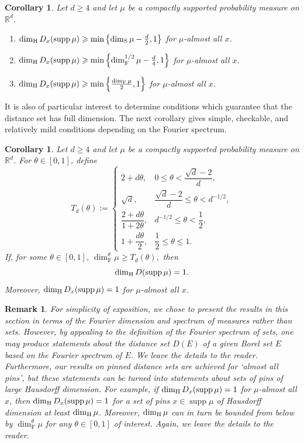 \documentclass[11pt]{amsart}
\numberwithin{equation}{section}
\renewcommand{\ge}{\geqslant}
\renewcommand{\le}{\leqslant}
\newcommand{\hd}{\dim_{\textup{H}}}
\newcommand{\fs}{\dim^\theta_{\mathrm{F}}}
\newcommand{\fd}{\dim_{\mathrm{F}}}
\newcommand{\sd}{\dim_{\mathrm{S}}}
\newtheorem{remark}[theorem]{Remark}
\newtheorem{corollary}[theorem]{Corollary}
\newcommand{\spt}{\operatorname{supp}}
\theoremstyle{plain}
\theoremstyle{remark}
\newcommand{\Rd}{\mathbb{R}^d}
\begin{document}
\begin{corollary}\label{cor2}
Let \(d\ge 4\) and let \(\mu\) be a compactly supported probability measure on \(\Rd\).
\begin{enumerate}
    \item \(\hd D_x(\spt\mu)\ge \min\left\{\sd\mu-\frac d2,1\right\}\) for \(\mu\)-almost all \(x\).

    \item \(\hd D_x(\spt\mu)\ge \min\left\{\dim_{\mathrm{F}}^{1/2}\mu-\frac d4,1\right\}\) for \(\mu\)-almost all \(x\).

    \item \(\hd D_x(\spt\mu)\ge \min\left\{\frac{\fd\mu}{2},1\right\}\) for \(\mu\)-almost all \(x\).
\end{enumerate}
\end{corollary}
It is also of particular interest to determine conditions which guarantee that the distance set has full dimension. The next corollary gives simple, checkable, and relatively mild conditions depending on the Fourier spectrum.

\begin{corollary}\label{cor3}
Let \(d\ge 4\) and let \(\mu\) be a compactly supported probability measure on \(\Rd\). For $\theta \in [0,1]$, define
\[
T_d(\theta):=
\begin{cases}
2+d\theta, & 0 \le \theta < \dfrac{\sqrt d - 2}{d},\\[1ex]
\sqrt d, & \dfrac{\sqrt d - 2}{d} \le \theta < d^{-1/2},\\[1ex]
\dfrac{2+d\theta}{1+2\theta}, & d^{-1/2}\le \theta < \dfrac12,\\[2ex]
1+\dfrac{d\theta}{2}, & \dfrac12 \le \theta\le 1.
\end{cases}
\]
If, for some \(\theta\in[0,1]\),
\(
\dim_{\mathrm{F}}^\theta\mu \ge T_d(\theta),
\)
then
\[
\hd D(\spt\mu)=1.
\]
Moreover,
\(
\hd D_x(\spt\mu)=1 
\)
 for \(\mu\)-almost all $x$.
\end{corollary}


 

 
 
 
 \begin{remark}
For simplicity of exposition, we chose to present the results in this section in terms of the Fourier dimension and spectrum of measures rather than sets.  However, by appealing to the definition of the Fourier spectrum of sets, one may produce   statements about the distance set $D(E)$ of a given Borel set $E$  based on the Fourier spectrum of $E$.  We leave the details to the reader.  Furthermore, our results on pinned distance sets are achieved for `almost all pins', but these statements can  be turned into statements about sets of pins of large Hausdorff dimension.  For example, if $\hd D_x(\spt \mu) = 1$ for $\mu$-almost all $x$, then $\hd D_x(\spt \mu) = 1$ for a set of pins $x \in \spt \mu$ of Hausdorff dimension at least $\hd \mu$.  Moreover,   $\hd \mu$ can in turn be bounded from below by $\fs \mu$ for any $\theta \in [0,1]$ of interest. Again, we leave the details to the reader. 
 \end{remark}
 
\end{document}
